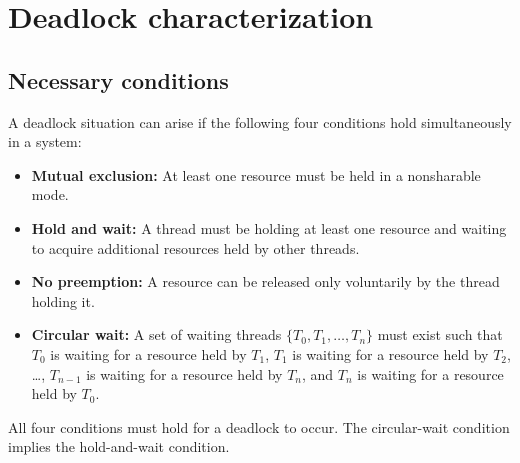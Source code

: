 \section{Deadlock characterization}

\subsection{Necessary conditions}
A deadlock situation can arise if the following four conditions hold simultaneously in a system:
\begin{itemize}
    \item \textbf{Mutual exclusion:} At least one resource must be held in a nonsharable mode.
    \item \textbf{Hold and wait:} A thread must be holding at least one resource and waiting to acquire additional resources held by other threads.
    \item \textbf{No preemption:} A resource can be released only voluntarily by the thread holding it.
    \item \textbf{Circular wait:} A set of waiting threads $\{T_0, T_1, \dots, T_n\}$ must exist such that $T_0$ is waiting for a resource held by $T_1$, $T_1$ is waiting for a resource held by $T_2$, \dots, $T_{n-1}$ is waiting for a resource held by $T_n$, and $T_n$ is waiting for a resource held by $T_0$.
\end{itemize}
All four conditions must hold for a deadlock to occur. The circular-wait condition implies the hold-and-wait condition.

